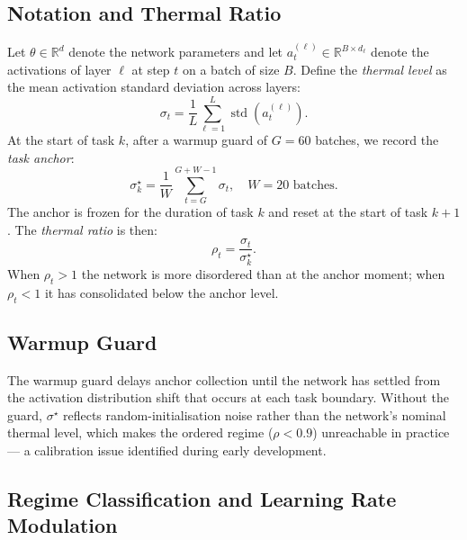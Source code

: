 \documentclass[10pt,a4paper]{article}
\begin{document}
\subsection{Notation and Thermal Ratio}

Let $\theta \in \mathbb{R}^d$ denote the network parameters and let
$a^{(\ell)}_t \in \mathbb{R}^{B \times d_\ell}$ denote the activations of layer $\ell$
at step $t$ on a batch of size $B$.
Define the \emph{thermal level} as the mean activation standard deviation across layers:
\begin{equation}
    \sigma_t = \frac{1}{L}\sum_{\ell=1}^{L} \operatorname{std}\!\left(a^{(\ell)}_t\right).
\end{equation}
At the start of task $k$, after a warmup guard of $G = 60$ batches, we record the
\emph{task anchor}:
\begin{equation}
    \sigma^\star_k = \frac{1}{W}\sum_{t=G}^{G+W-1} \sigma_t,
    \quad W = 20 \text{ batches}.
    \label{eq:anchor}
\end{equation}
The anchor is frozen for the duration of task $k$ and reset at the start of task $k+1$.
The \emph{thermal ratio} is then:
\begin{equation}
    \rho_t = \frac{\sigma_t}{\sigma^\star_k}.
    \label{eq:rho}
\end{equation}
When $\rho_t > 1$ the network is more disordered than at the anchor moment; when
$\rho_t < 1$ it has consolidated below the anchor level.

\subsection{Warmup Guard}

The warmup guard delays anchor collection until the network has settled from the
activation distribution shift that occurs at each task boundary.
Without the guard, $\sigma^\star$ reflects random-initialisation noise rather than
the network's nominal thermal level, which makes the ordered regime ($\rho < 0.9$)
unreachable in practice --- a calibration issue identified during early development.

\subsection{Regime Classification and Learning Rate Modulation}
\end{document}
